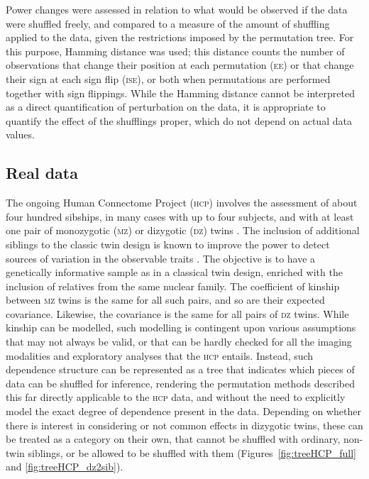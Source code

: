 Power changes were assessed in relation to what would be observed if the data were shuffled freely, and compared to a measure of the amount of shuffling applied to the data, given the restrictions imposed by the permutation tree. For this purpose, Hamming distance \citep{Hamming1950} was used; this distance counts the number of observations that change their position at each permutation (\textsc{ee}) or that change their sign at each sign flip (\textsc{ise}), or both when permutations are performed together with sign flippings. While the Hamming distance cannot be interpreted as a direct quantification of perturbation on the data, it is appropriate to quantify the effect of the shufflings proper, which do not depend on actual data values.

\subsection{Real data}
\label{sec:ptree:meth_hcp}

The ongoing Human Connectome Project (\textsc{hcp}) involves the assessment of about four hundred sibships, in many cases with up to four subjects, and with at least one pair of monozygotic (\textsc{mz}) or dizygotic (\textsc{dz}) twins \citep{VanEssen2012, VanEssen2013}. The inclusion of additional siblings to the classic twin design is known to improve the power to detect sources of variation in the observable traits \citep{Posthuma2000, Keller2010}. The objective is to have a genetically informative sample as in a classical twin design, enriched with the inclusion of relatives from the same nuclear family. The coefficient of kinship between \textsc{mz} twins is the same for all such pairs, and so are their expected covariance. Likewise, the covariance is the same for all pairs of \textsc{dz} twins. While kinship can be modelled, such modelling is contingent upon various assumptions that may not always be valid, or that can be hardly checked for all the imaging modalities and exploratory analyses that the \textsc{hcp} entails. Instead, such dependence structure can be represented as a tree that indicates which pieces of data can be shuffled for inference, rendering the permutation methods described this far directly applicable to the \textsc{hcp} data, and without the need to explicitly model the exact degree of dependence present in the data. Depending on whether there is interest in considering or not common effects in dizygotic twins, these can be treated as a category on their own, that cannot be shuffled with ordinary, non-twin siblings, or be allowed to be shuffled with them (Figures~\ref{fig:treeHCP_full} and \ref{fig:treeHCP_dz2sib}).

